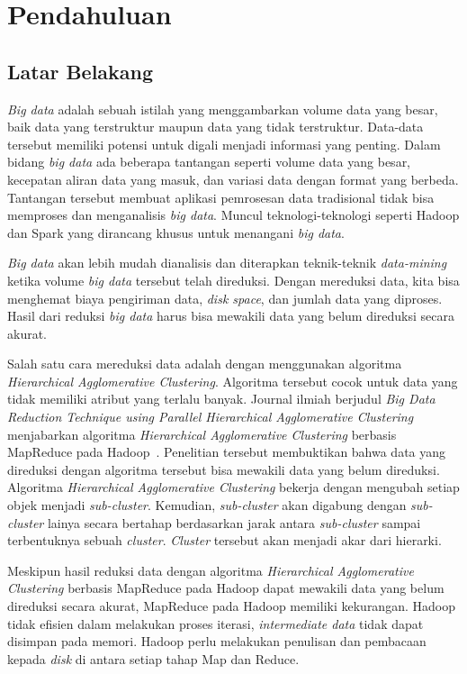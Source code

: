 \chapter{Pendahuluan}
\label{chap:intro}
   
\section{Latar Belakang}
\label{sec:label}

{\it Big data} adalah sebuah istilah yang menggambarkan volume data yang besar, baik data yang terstruktur maupun data yang tidak terstruktur. Data-data tersebut memiliki potensi untuk digali menjadi informasi yang penting. Dalam bidang {\it big data} ada  beberapa tantangan seperti volume data yang besar, kecepatan aliran data yang masuk, dan variasi data dengan format yang berbeda. Tantangan tersebut membuat aplikasi pemrosesan data tradisional  tidak bisa memproses dan menganalisis {\it big data}. Muncul teknologi-teknologi seperti Hadoop dan Spark yang dirancang khusus untuk menangani {\it big data}. 

{\it Big data} akan lebih mudah dianalisis dan diterapkan teknik-teknik {\it data-mining} ketika volume {\it big data} tersebut telah direduksi. Dengan mereduksi data, kita bisa menghemat biaya pengiriman data, {\it disk space}, dan jumlah data yang diproses. Hasil dari reduksi {\it big data} harus bisa mewakili data yang belum direduksi secara akurat. 

Salah satu cara mereduksi data adalah dengan menggunakan algoritma {\it Hierarchical Agglomerative Clustering}. Algoritma tersebut cocok untuk data yang tidak memiliki atribut yang terlalu banyak. Journal ilmiah berjudul {\it Big Data Reduction Technique using Parallel Hierarchical Agglomerative Clustering} menjabarkan algoritma {\it Hierarchical Agglomerative Clustering} berbasis MapReduce pada Hadoop~\cite{veronica:02:bdhca}. Penelitian tersebut membuktikan bahwa data yang direduksi dengan algoritma tersebut bisa mewakili data yang belum direduksi. Algoritma {\it Hierarchical Agglomerative Clustering} bekerja dengan mengubah setiap objek menjadi {\it sub-cluster}. Kemudian, {\it sub-cluster} akan digabung dengan {\it sub-cluster} lainya secara bertahap berdasarkan jarak antara {\it sub-cluster} sampai terbentuknya sebuah \textit{cluster}. {\it Cluster} tersebut akan menjadi akar dari hierarki.

Meskipun hasil reduksi data dengan algoritma {\it Hierarchical Agglomerative Clustering} berbasis MapReduce pada Hadoop dapat mewakili data yang belum direduksi secara akurat, MapReduce pada Hadoop memiliki kekurangan. Hadoop tidak efisien dalam melakukan proses iterasi, {\it intermediate data} tidak dapat disimpan pada memori. Hadoop perlu melakukan penulisan dan pembacaan kepada \textit{disk} di antara setiap tahap Map dan Reduce.

